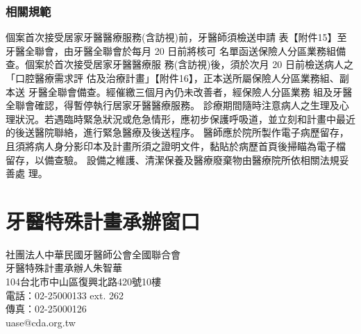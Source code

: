 \subsubsection{相關規範}
\begin{outline}
\1 個案首次接受居家牙醫醫療服務(含訪視)前，牙醫師須檢送申請
表【附件15】至牙醫全聯會，由牙醫全聯會於每月 20 日前將核可 名單函送保險人分區業務組備查。個案於首次接受居家牙醫醫療服 務(含訪視)後，須於次月 20 日前檢送病人之「口腔醫療需求評 估及治療計畫」【附件16】，正本送所屬保險人分區業務組、副本送 牙醫全聯會備查。經催繳三個月內仍未改善者，經保險人分區業務 組及牙醫全聯會確認，得暫停執行居家牙醫醫療服務。
\1 診療期間隨時注意病人之生理及心理狀況。若遇臨時緊急狀況或危急情形，應初步保護呼吸道，並立刻和計畫中最近的後送醫院聯絡，進行緊急醫療及後送程序。
\1 醫師應於院所製作電子病歷留存，且須將病人身分影印本及計畫所須之證明文件，黏貼於病歷首頁後掃瞄為電子檔 留存，以備查驗。
\1 設備之維護、清潔保養及醫療廢棄物由醫療院所依相關法規妥善處
理。

\end{outline}

\section{牙醫特殊計畫承辦窗口}
\noindent 社團法人中華民國牙醫師公會全國聯合會\\
牙醫特殊計畫承辦人朱智華\\
104台北市中山區復興北路420號10樓\\
電話：02-25000133 ext. 262\\
傳真：02-25000126\\
uase@cda.org.tw\\